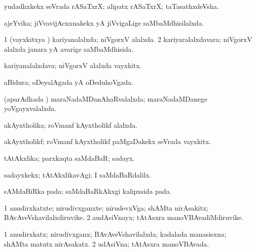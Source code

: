 \bentry
{}
\gl{\nA}
\bmng
yudadhxkekx seVrada rASaTxrX; alipatx rASaTxrX; taTasathxdeVsha. 
\emng
\eentry

\bentry
{}
\gl{\gu}
\bmng
ajeYvika; jiVvavijAcnxnakekx yA jiVvigaLige saMbaMdhisilalxda. 
\emng
\eentry

\bentry
{}
\gl{\gu}
\bmng
\bnum
\num{1} (vayxkitxya \vi) kariyanalalxda; niVgorxV alalxda. 
\num{2} kariyaralalxdavara; niVgorxV alalxda janara yA avarige saMbaMdhisida. 
\enum
\emng
\eentry

\bentry
{}
\gl{\nA}
\bmng
kariyanalalxdava; niVgorxV alalxda vayxkitx. 
\emng
\eentry

\bentry
{}
\gl{\gu}
\bmng
aBidura; oDeyalAgada yA oDeduhoVgada. 
\emng
\eentry

\bentry
{}
\gl{\gu}
\bmng
(aparAdhada \vi) maraNadaMDanAhaRvalalxda; maraNadaMDanege yoVgayxvalalxda. 
\emng
\eentry

\bentry
{}
\gl{\gu}
\bmng
akAyxtholika; roVmanf kAyxtholikf alalxda. 
\emng
\eentry

\bentry
{}
\gl{\nA}
\bmng
akAyxtholikf; roVmanf kAyxtholikf paMgaDakekx seVrada vayxkitx. 
\emng
\eentry

\bentry
{}
\gl{\nA}
\bmng
tAtAkxlika; parxkaqta saMdaBaR; sadayx. 
\emng

\noindent
\gl{\pagu}
\bmng
{} sadayxkekx; tAtAkxlikavAgi; I saMdaBaRdalilx. 
\emng
\eentry

\bentry
{}
\gl{\nA}
\bmng
sAMdaBiRka pada; saMdaBaRkAkxgi kalipxsida pada. 
\emng
\eentry

\bentry
{}
\gl{\nA}
\bmng
\bnum
\num{1} anudirxkatxte; nirudivxganxte; nirudevxVga; shAMta nirAsakitx; BAvAveVshavilalxdiruvike. 
\num{2} audAsiVnayx; tAtAsxra manoVBAvadiMdiruvike. 
\enum
\emng
\eentry



\bentry
{}
\gl{\gu}
\bmng
\bnum
\num{1} anudirxkatx; nirudivxganx; BAvAveVshavilalxda; kadalada manasisxna; shAMta matutx nirAsakatx. 
\num{2} udAsiVna; tAtAsxra manoVBAvada. 
\enum
\emng
\eentry

